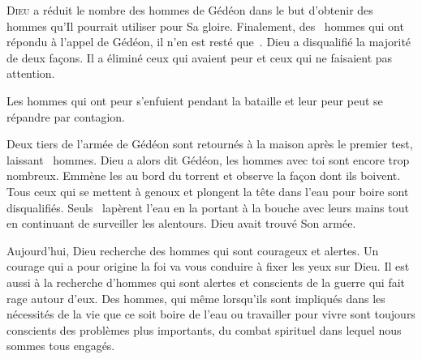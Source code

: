 





\lettrine{D}{ieu} a réduit le nombre des hommes de Gédéon
 dans le but d'obtenir des hommes qu'Il pourrait utiliser pour Sa gloire.
 Finalement, des ~hommes qui ont répondu à l'appel de Gédéon,
 il n'en est resté que~.
 Dieu a disqualifié la majorité de deux fa\c{c}ons.
 Il a éliminé ceux qui avaient peur et ceux qui ne faisaient pas attention.

Les hommes qui ont peur s'enfuient pendant la bataille et leur peur peut
 se répandre par contagion.


Deux tiers de l'armée de Gédéon sont retournés à la maison
 après le premier test, laissant ~hommes.
 Dieu a alors dit\frcolon{}
 \Og Gédéon, les hommes avec toi sont encore trop nombreux.
 Emmène les au bord du torrent et observe la fa\c{c}on dont ils boivent.
 Tous ceux qui se mettent à genoux et plongent la tête dans l'eau pour boire
 sont disqualifiés. \Fg{}
 Seuls ~lapèrent l'eau en la portant à la bouche avec leurs mains
 tout en continuant de surveiller les alentours. Dieu avait trouvé Son armée.

Aujourd'hui, Dieu recherche des hommes qui sont courageux et alertes.
 Un courage qui a pour origine la foi va vous conduire
 à fixer les yeux sur Dieu. Il est aussi à la recherche d'hommes
 qui sont alertes et conscients de la guerre qui fait rage autour d'eux.
 Des hommes, qui même lorsqu'ils sont impliqués dans les nécessités de la vie
 \ocadr que ce soit boire de l'eau ou travailler pour vivre \fcadr{}
 sont toujours conscients des problèmes plus importants,
 du combat spirituel dans lequel nous sommes tous engagés. 

\dvrule



